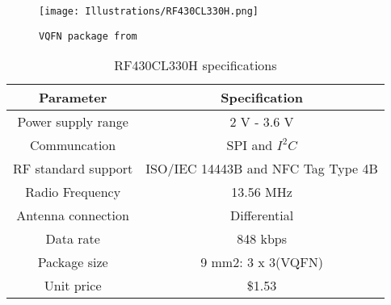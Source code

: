 \begin{figure}[h]
\begin{flushright}
\texttt{[image: Illustrations/RF430CL330H.png]}  
\caption{\texttt{VQFN package from \cite{TexasInstruments2012}}}
\end{flushright}
\end{figure}



\begin{table}[!h]
\centering
\begin{tabular}{|c|c|}
\hline 
\rowcolor{Gray}
Parameter & Specification \\ 
\hline 
Power supply range & 2 V - 3.6 V \\ 
\hline 
Communcation & SPI and $I^2C$ \\ 
\hline 
RF standard support & ISO/IEC 14443B and NFC Tag Type 4B   \\ 
\hline 
Radio Frequency & 13.56 MHz \\ 
\hline 
Antenna connection & Differential \\ 
\hline 
Data rate & 848 kbps \\ 
\hline 
Package size & 9 mm2: 3 x 3(VQFN)    \\ 
\hline 
Unit price &  \$1.53  \\ 
\hline 
\end{tabular} 
\caption{RF430CL330H specifications} \label{tb:sepc} 
\end{table}

